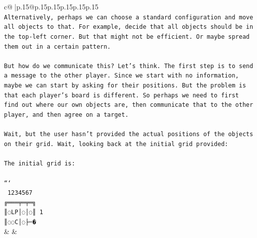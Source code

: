 \documentclass{article}
\begin{document}
{\begin{supertabular}{c@{$\;$}|p{.15\linewidth}@{}p{.15\linewidth}p{.15\linewidth}p{.15\linewidth}p{.15\linewidth}p{.15\linewidth}}
{{{\\ 
\texttt{Alternatively, perhaps we can choose a standard configuration and move all objects to that. For example, decide that all objects should be in the top{-}left corner. But that might not be efficient. Or maybe spread them out in a certain pattern.} \\
\\ 
\texttt{But how do we communicate this? Let's think. The first step is to send a message to the other player. Since we start with no information, maybe we can start by asking for their positions. But the problem is that each player's board is different. So perhaps we need to first find out where our own objects are, then communicate that to the other player, and then agree on a target.} \\
\\ 
\texttt{Wait, but the user hasn't provided the actual positions of the objects on their grid. Wait, looking back at the initial grid provided:} \\
\\ 
\texttt{The initial grid is:} \\
\\ 
\texttt{```} \\
\texttt{ 1234567} \\
\texttt{╔═══╤═╤═╗} \\
\texttt{║◌LP│◌│◌║ 1} \\
\texttt{║◌◌C│◌├─�} \\
            }
        }
    }
    & & \\ \\


\end{supertabular}}
\end{document}

